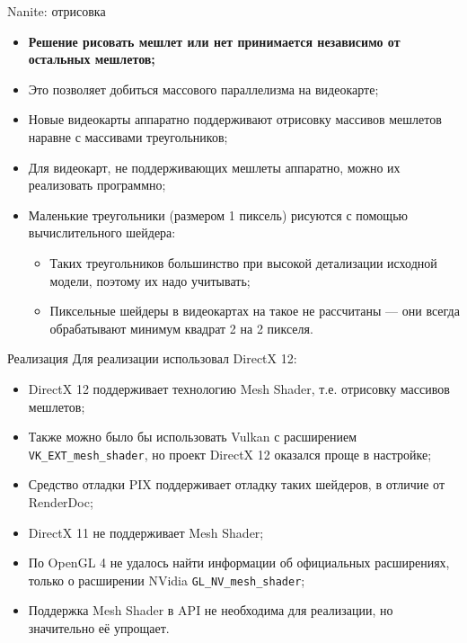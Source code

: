 \documentclass{beamer}
\begin{document}
    \begin{frame}{Nanite: отрисовка}
        \begin{itemize}
            \item \textbf{Решение рисовать мешлет или нет
            принимается независимо от остальных мешлетов;}
            \item Это позволяет добиться массового параллелизма
            на видеокарте;
            \item Новые видеокарты аппаратно поддерживают отрисовку
            массивов мешлетов наравне с массивами треугольников;
            \item Для видеокарт, не поддерживающих мешлеты аппаратно,
            можно их реализовать программно;
            \item Маленькие треугольники (размером 1 пиксель)
            рисуются с помощью вычислительного шейдера:
            \begin{itemize}
                \item Таких треугольников большинство
                при высокой детализации исходной модели,
                поэтому их надо учитывать;
                \item Пиксельные шейдеры в видеокартах
                на такое не рассчитаны --- они всегда
                обрабатывают минимум квадрат 2 на 2 пикселя.
            \end{itemize}
        \end{itemize}
    \end{frame}

    \begin{frame}{Реализация}
        Для реализации использовал DirectX 12:
        \begin{itemize}
            \item DirectX 12 поддерживает технологию Mesh Shader,
            т.е. отрисовку массивов мешлетов;
            \item Также можно было бы использовать Vulkan
            с расширением \texttt{VK\_EXT\_mesh\_shader},
            но проект DirectX 12 оказался проще в настройке;
            \item Средство отладки PIX поддерживает отладку
            таких шейдеров, в отличие от RenderDoc;
            \item DirectX 11 не поддерживает Mesh Shader;
            \item По OpenGL 4 не удалось найти информации
            об официальных расширениях,
            только о расширении NVidia
            \texttt{GL\_NV\_mesh\_shader};
            \item Поддержка Mesh Shader в API не необходима
            для реализации, но значительно её упрощает.
        \end{itemize}
    \end{frame}
\end{document}
